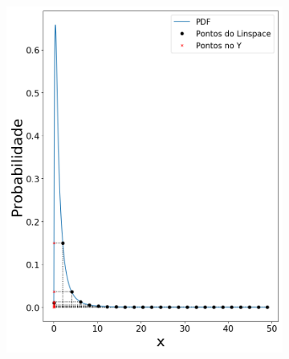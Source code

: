 \begin{figure}[H]
\begin{subfigure}[b]{0.3\textwidth}
		\caption{}
		\label{fig:lin050}
	\end{subfigure}
	
	\begin{subfigure}[b]{0.3\textwidth}
		\centering 
		\includegraphics[width=\textwidth]{./figuras/lognormal_1}
		\caption{}
		\label{fig:lin100}
	\end{subfigure}
	\hfill
	\begin{subfigure}[b]{0.3\textwidth}
		\centering 

\end{subfigure}
\end{figure}
